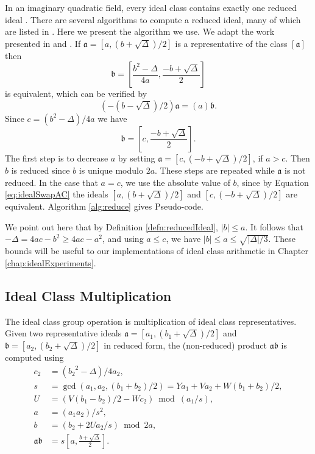 \documentclass{ucalgthes1}
\theoremstyle{definition}
\newcommand{\ideal}{\mathfrak}
\newcommand{\idealclass}[1]{\left[ \ideal #1 \right]}
\newcommand{\aclass}{\idealclass a}
\begin{document}
In an imaginary quadratic field, every ideal class contains exactly one reduced ideal \cite[p.20]{Ramachandran2006}.  There are several algorithms to compute a reduced ideal, many of which are listed in \cite{Jacobson2006}.  Here we present the algorithm we use.  We adapt the work presented in \cite[p.90]{Jacobson2006} and \cite[p.99]{Jacobson2009}. If $\ideal a = [a, (b + \sqrt\Delta)/2]$ is a representative of the class $\aclass$ then
\begin{equation}
\label{eq:idealSwapNorm}
	\ideal b = \left[ \frac{b^2-\Delta}{4a}, \frac{-b + \sqrt\Delta}{2} \right]
\end{equation}
is equivalent, which can be verified by
\[
	\left(-(b - \sqrt\Delta)/2 \right) \ideal a = (a) \ideal b.
\]
Since $c = (b^2 - \Delta)/4a$ we have
\begin{equation}
\label{eq:idealSwapAC}
	\ideal b = \left[ c, \frac{-b + \sqrt\Delta}{2} \right].
\end{equation}
The first step is to decrease $a$ by setting $\ideal a = [c, (-b + \sqrt\Delta)/2]$, if $a > c$.  Then $b$ is reduced since $b$ is unique modulo $2a$.  These steps are repeated while $\ideal a$ is not reduced. In the case that $a = c$, we use the absolute value of $b$, since by Equation \ref{eq:idealSwapAC} the ideals $[a, (b + \sqrt\Delta)/2]$ and $[c, (-b+\sqrt\Delta)/2]$ are equivalent.  Algorithm \ref{alg:reduce} gives Pseudo-code.

We point out here that by Definition \ref{defn:reducedIdeal}, $|b| \le a$.  It follows that $-\Delta = 4ac - b^2 \ge 4ac -a^2$, and using $a \le c$, we have $|b| \le a \le \sqrt{|\Delta|/3}$.  These bounds will be useful to our implementations of ideal class arithmetic in Chapter \ref{chap:idealExperiments}.


\subsection{Ideal Class Multiplication}
\label{subsec:idealMultiply}

The ideal class group operation is multiplication of ideal class representatives. Given two representative ideals $\mathfrak a = [a_1, (b_1 + \sqrt{\Delta})/2]$ and $\mathfrak b = [a_2, (b_2 + \sqrt{\Delta})/2]$ in reduced form, the (non-reduced) product $\mathfrak a \mathfrak b$ is computed using
\begin{align}
	c_2 & = ({b_2}^2-\Delta)/4a_2, \nonumber \\
	s & = \gcd(a_1, a_2, (b_1+b_2)/2) = Ya_1 + Va_2 + W(b_1+b_2)/2,    \label{eq:idealProductS} \\
	U & = (V(b_1-b_2)/2 - Wc_2) \bmod{(a_1/s)},                        \label{eq:idealProductU} \\
	a & = (a_1a_2)/s^2,                                                \label{eq:idealProductA} \\
	b & = (b_2 + 2Ua_2/s) \bmod{2a},                                   \label{eq:idealProductB} \\
	\mathfrak a \mathfrak b & = s\left[a, \frac{b + \sqrt{\Delta}}{2}\right]. \nonumber
\end{align}
\end{document}
